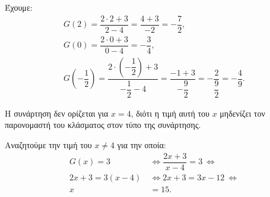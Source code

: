 
\begin{alist}
\item Έχουμε:
\begin{gather*}
G(2) = \dfrac{2 \cdot 2 + 3}{2 - 4} = \dfrac{4 + 3}{-2} = -\dfrac{7}{2},\\
G(0) = \dfrac{2 \cdot 0 + 3}{0 - 4} = -\dfrac{3}{4}, \\
G\left(-\dfrac{1}{2}\right) = \dfrac{2 \cdot \left(-\dfrac{1}{2}\right) + 3}{-\dfrac{1}{2} - 4} = \dfrac{-1 + 3}{-\dfrac{9}{2}} = -\dfrac{2}{\dfrac{9}{2}} = -\dfrac{4}{9}.
\end{gather*}

\item Η συνάρτηση δεν ορίζεται για $x = 4$, διότι η τιμή αυτή του $x$ μηδενίζει τον παρονομαστή του κλάσματος στον τύπο της συνάρτησης.

\item Αναζητούμε την τιμή του $x \ne 4$ για την οποία:
\begin{align*}
G(x) = 3 \ &\Leftrightarrow 
\dfrac{2x + 3}{x - 4} = 3 \ \Leftrightarrow \\
2x + 3 = 3(x - 4) \ &\Leftrightarrow 
2x + 3 = 3x - 12 \ \Leftrightarrow \\
x &= 15.
\end{align*}
\end{alist}

